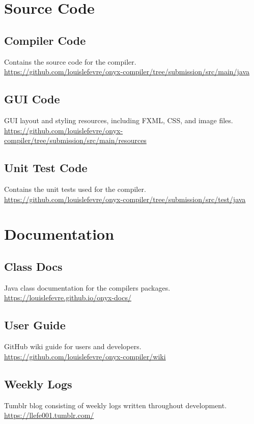 \documentclass[
]{report}
\begin{document}
\printglossary

\begin{appendices}
	\chapter{Source Code}
	\section{Compiler Code}
	\label{appendix:compiler-code}
	Contains the source code for the compiler.\\
	\url{https://github.com/louislefevre/onyx-compiler/tree/submission/src/main/java}
	\section{GUI Code}
	\label{appendix:gui-code}
	GUI layout and styling resources, including FXML, CSS, and image files.\\
	\url{https://github.com/louislefevre/onyx-compiler/tree/submission/src/main/resources}
	\section{Unit Test Code}
	\label{appendix:unit-test-code}
	Contains the unit tests used for the compiler.\\
	\url{https://github.com/louislefevre/onyx-compiler/tree/submission/src/test/java}

	\chapter{Documentation}
	\section{Class Docs}
	\label{appendix:class-docs}
	Java class documentation for the compilers packages.\\
	\url{https://louislefevre.github.io/onyx-docs/}
	\section{User Guide}
	\label{appendix:user-guide}
	GitHub wiki guide for users and developers.\\
	\url{https://github.com/louislefevre/onyx-compiler/wiki}
	\section{Weekly Logs}
	\label{appendix:weekly-logs}
	Tumblr blog consisting of weekly logs written throughout development.\\
	\url{https://llefe001.tumblr.com/}

\end{appendices}
\end{document}
